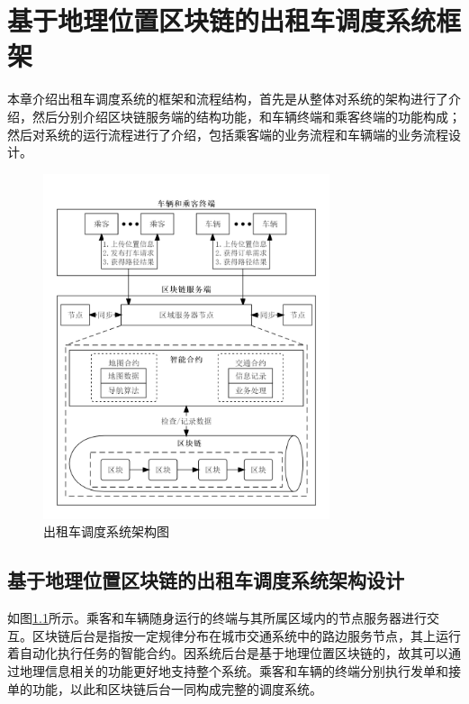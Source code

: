 \chapter{基于地理位置区块链的出租车调度系统框架}

本章介绍出租车调度系统的框架和流程结构，首先是从整体对系统的架构进行了介绍，然后分别介绍区块链服务端的结构功能，和车辆终端和乘客终端的功能构成；然后对系统的运行流程进行了介绍，包括乘客端的业务流程和车辆端的业务流程设计。

\begin{figure}[h]
  \centering
  \includegraphics[width=0.75\textwidth]{figures/structure}
  \caption{出租车调度系统架构图}\label{fig:structure}
\end{figure}

\section{基于地理位置区块链的出租车调度系统架构设计}
如图\ref{fig:structure}所示。乘客和车辆随身运行的终端与其所属区域内的节点服务器进行交互。区块链后台是指按一定规律分布在城市交通系统中的路边服务节点，其上运行着自动化执行任务的智能合约。因系统后台是基于地理位置区块链的，故其可以通过地理信息相关的功能更好地支持整个系统。乘客和车辆的终端分别执行发单和接单的功能，以此和区块链后台一同构成完整的调度系统。

